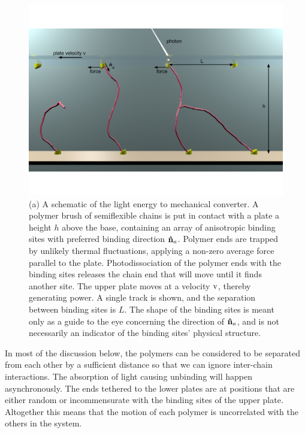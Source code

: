 \documentclass[11pt]{ucthesis}
\begin{document}
\begin{figure}[htp]
\begin{center}
\includegraphics[width = \textwidth]{Fig1_label}
\caption{
(a) A schematic of the light energy to mechanical converter. A polymer
brush of semiflexible chains is put in contact
with a  plate a height $h$ above the base, containing an array of anisotropic binding sites with preferred binding direction ${\bf \hat n}_a$. Polymer ends are trapped by unlikely thermal fluctuations, applying a non-zero average force parallel to
the plate. Photodissociation of the polymer ends 
with the binding sites releases the chain end that will move until it finds
another site. The upper plate moves at a velocity $\rm v$, thereby generating
power. A single track is shown, and the separation between binding sites is $L$. The shape of the binding sites is meant only as a guide to the eye concerning the direction of ${\bf \hat n}_a$, and is not necessarily an indicator of the binding sites' physical structure.
}
\label{fig:device}
\end{center}
\end{figure}

In most of the discussion below, the polymers can be considered to be separated
from each other by a sufficient distance so that we can ignore inter-chain interactions.
The absorption of light causing unbinding will happen asynchronously. The ends
tethered to the lower plates are at positions that are either random or
incommensurate with the binding sites of the upper plate. Altogether this means that
the motion of each polymer is uncorrelated with the others in the system.
\end{document}
